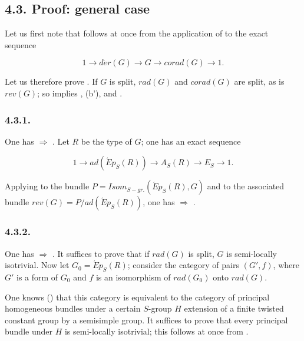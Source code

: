 \subsection*{4.3. Proof: general case}

Let us first note that  follows at once from the application of  to the exact sequence

\[ 1 \to d\acute{e}r(G) \to G \to corad(G) \to 1. \]

Let us therefore prove . If \(G\) is split, \(rad(G)\) and \(corad(G)\) are split, as is \(rev(G)\); so  implies ,
(b'), and .

\subsubsection*{4.3.1.}

One has  \(\Rightarrow\) . Let \(R\) be the type of \(G\); one has an exact sequence

\[ 1 \to ad(\acute{E}p_{S}(R)) \to A_{S}(R) \to E_{S} \to 1. \]

Applying  to the bundle \(P = Isom_{S-gr.}(\acute{E}p_{S}(R), G)\) and to the associated bundle \(rev(G) = P /
ad(\acute{E}p_{S}(R))\), one has  \(\Rightarrow\) .

\subsubsection*{4.3.2.}

One has  \(\Rightarrow\) . It suffices to prove that if \(rad(G)\) is split, \(G\) is semi-locally isotrivial. Now let \(G_{0} =
\acute{E}p_{S}(R)\); consider the category of pairs \((G',f)\), where \(G'\) is a form of \(G_0\) and \(f\) is an isomorphism of
\(rad(G_{0})\) onto \(rad(G)\).

One knows () that this category is equivalent to the category of principal homogeneous bundles under a certain
\(S\)-group \(H\) extension of a finite twisted constant group by a semisimple group. It suffices to prove that every
principal bundle under \(H\) is semi-locally isotrivial; this follows at once from .

